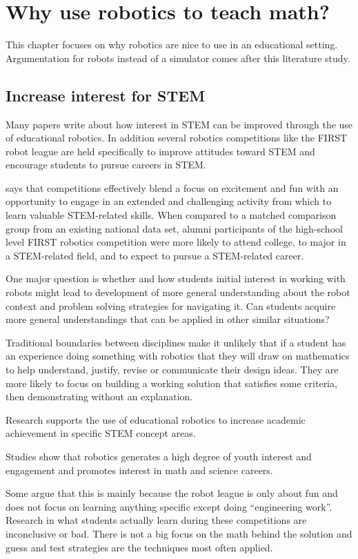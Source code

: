 \section{Why use robotics to teach math?}
This chapter focuses on why robotics are nice to use in an educational setting. Argumentation for robots instead of a simulator comes after this literature study.
\subsection{Increase interest for STEM}
Many papers write about how interest in STEM can be improved through the use of educational robotics. In addition several robotics competitions like the FIRST robot league are held specifically to improve attitudes toward STEM and encourage students to pursue careers in STEM.

\cite{silk2011resources} says that competitions effectively blend a focus on excitement and fun with an opportunity to engage in an extended and challenging activity from which to learn valuable STEM-related skills. When compared to a matched comparison group from an existing national data set, alumni participants of the high-school level FIRST robotics competition were more likely to attend college, to major in a STEM-related field, and to expect to pursue a STEM-related career. 

One major question is whether and how students initial interest in working with robots might lead to development of more general understanding about the robot context and problem solving strategies for navigating it. Can students acquire more general understandings that can be applied in other similar situations?

Traditional boundaries between disciplines make it unlikely that if a student has an experience doing something with robotics that they will draw on mathematics to help understand, justify, revise or communicate their design ideas. They are more likely to focus on building a working solution that satisfies some criteria, then demonstrating without an explanation. 

\cite{nugent2009use} Research supports the use of educational robotics to increase academic achievement in specific STEM concept areas.

\cite{nugent2009use} Studies show that robotics generates a high degree of youth interest and engagement and promotes interest in math and science careers.

Some argue that this is mainly because the robot league is only about fun and does not focus on learning anything specific except doing "`engineering work"'. Research in what students actually learn during these competitions are inconclusive or bad. There is not a big focus on the math behind the solution and guess and test strategies are the techniques most often applied.

